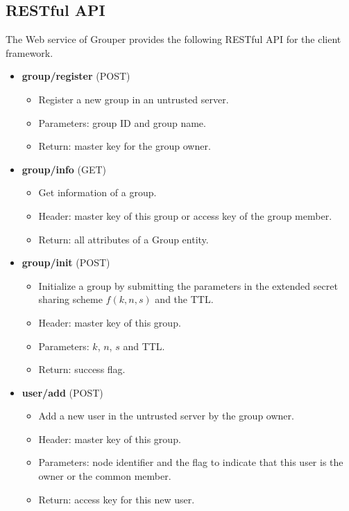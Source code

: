 \documentclass[a4paper,11pt]{report}
\begin{document}
\subsection{RESTful API}

The Web service of Grouper provides the following RESTful API for the client framework.

\begin{itemize}[leftmargin=7mm]
	\setlength{\itemsep}{1pt}
	\setlength{\parskip}{0pt}
	\setlength{\parsep}{0pt}
	\item 
	\textbf{group/register} (POST)
	\begin{itemize}
		\item Register a new group in an untrusted server.
		\item Parameters: group ID and group name.
		\item Return: master key for the group owner. 
	\end{itemize}
	\item 
	\textbf{group/info} (GET)
	\begin{itemize}
		\item Get information of a group.
		\item Header: master key of this group or access key of the group member.
		\item Return: all attributes of a Group entity. 
	\end{itemize}
	\item 
	\textbf{group/init} (POST)
	\begin{itemize}
		\item Initialize a group by submitting the parameters in the extended secret sharing scheme $f(k, n, s)$ and the TTL.
		\item Header: master key of this group.
		\item Parameters: $k$, $n$, $s$ and TTL.
		\item Return: success flag.
	\end{itemize}
	\item 
	\textbf{user/add} (POST)
	\begin{itemize}
		\item Add a new user in the untrusted server by the group owner.
		\item Header: master key of this group.
		\item Parameters: node identifier and the flag to indicate that this user is the owner or the common member.
		\item Return: access key for this new user.
	\end{itemize}

\end{itemize}
\end{document}
